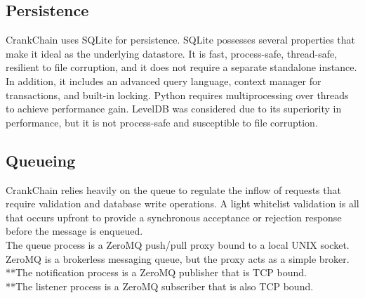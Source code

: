 \documentclass[10pt,twocolumn]{article}
\begin{document}
\subsection{Persistence}
CrankChain uses SQLite for persistence.  SQLite possesses several properties that make it ideal as the underlying datastore.  It is fast, process-safe, thread-safe, resilient to file corruption, and it does not require a separate standalone instance.  In addition, it includes an advanced query language, context manager for transactions, and built-in locking.  Python requires multiprocessing over threads to achieve performance gain.  LevelDB was considered due to its superiority in performance, but it is not process-safe and susceptible to file corruption.
\subsection{Queueing}
CrankChain relies heavily on the queue to regulate the inflow of requests that require validation and database write operations.  A light whitelist validation is all that occurs upfront to provide a synchronous acceptance or rejection response before the message is enqueued.\\
The queue process is a ZeroMQ push/pull proxy bound to a local UNIX socket.  ZeroMQ is a brokerless messaging queue, but the proxy acts as a simple broker.\\
**The notification process is a ZeroMQ publisher that is TCP bound.\\
**The listener process is a ZeroMQ subscriber that is also TCP bound.
\end{document}

